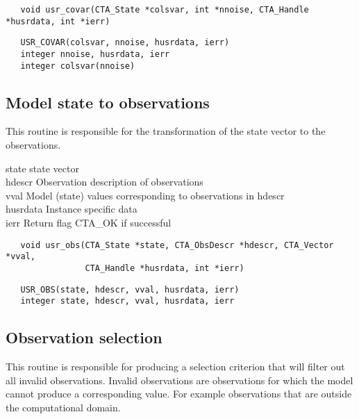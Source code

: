 \begin{verbatim}
   void usr_covar(CTA_State *colsvar, int *nnoise, CTA_Handle *husrdata, int *ierr)
\end{verbatim}

\begin{verbatim}
   USR_COVAR(colsvar, nnoise, husrdata, ierr)
   integer nnoise, husrdata, ierr
   integer colsvar(nnoise)
\end{verbatim}

\subsection{Model state to observations}
This routine is responsible for the transformation of the state vector to the observations. 

\horzline
\begin{tabbing}
\functab
{}
  {state}        {state vector}\\
  {hdescr}       {Observation description of observations}\\
 {vval}         {Model (state) values corresponding to observations in hdescr}\\
 {husrdata}  {Instance specific data}\\
    {ierr}      {Return flag CTA\_OK if successful}\\
\end{tabbing}
\horzline

\begin{verbatim}
   void usr_obs(CTA_State *state, CTA_ObsDescr *hdescr, CTA_Vector *vval,
                CTA_Handle *husrdata, int *ierr)
\end{verbatim}

\begin{verbatim}
   USR_OBS(state, hdescr, vval, husrdata, ierr)
   integer state, hdescr, vval, husrdata, ierr
\end{verbatim}

\subsection{Observation selection}
This routine is responsible for producing a selection criterion that will filter out all invalid observations.
Invalid observations are observations for which the model cannot produce a corresponding value. For example
observations that are outside the computational domain.

